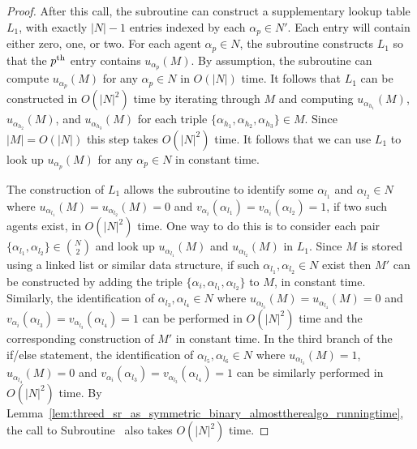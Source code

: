 \begin{proof}
After this call, the subroutine can construct a supplementary lookup table $L_1$, with exactly $|N|-1$ entries indexed by each $\alpha_p\in N'$. Each entry will contain either zero, one, or two. For each agent $\alpha_p\in N$, the subroutine constructs $L_1$ so that the $p\textsuperscript{th}$ entry contains $u_{\alpha_p}(M)$. By assumption, the subroutine can compute $u_{\alpha_p}(M)$ for any $\alpha_p\in N$ in $O(|N|)$ time. It follows that $L_1$ can be constructed in $O(|N|^2)$ time by iterating through $M$ and computing $u_{\alpha_{h_1}}(M)$, $u_{\alpha_{h_2}}(M)$, and $u_{\alpha_{h_3}}(M)$ for each triple $\{ \alpha_{h_1}, \alpha_{h_2}, \alpha_{h_3} \} \in M$. Since $|M|=O(|N|)$ this step takes $O(|N|^2)$ time. It follows that we can use $L_1$ to look up $u_{\alpha_{p}}(M)$ for any $\alpha_{p}\in N$ in constant time.

The construction of $L_1$ allows the subroutine to identify some $\alpha_{l_1}$ and $\alpha_{l_2}\in N$ where $u_{\alpha_{l_1}}(M)=u_{\alpha_{l_2}}(M)=0$ and $v_{\alpha_i}(\alpha_{l_1})=v_{\alpha_i}(\alpha_{l_2})=1$, if two such agents exist, in $O(|N|^2)$ time. One way to do this is to consider each pair $\{ \alpha_{l_1}, \alpha_{l_2} \} \in \binom{N}{2}$ and look up $u_{\alpha_{l_1}}(M)$ and $u_{\alpha_{l_2}}(M)$ in $L_1$. Since $M$ is stored using a linked list or similar data structure, if such $\alpha_{l_1}, \alpha_{l_2}\in N$ exist then $M'$ can be constructed by adding the triple $\{ \alpha_i, \alpha_{l_1}, \alpha_{l_2} \}$ to $M$, in constant time. Similarly, the identification of $\alpha_{l_3}, \alpha_{l_4}\in N$ where $u_{\alpha_{l_3}}(M)=u_{\alpha_{l_4}}(M)=0$ and $v_{\alpha_i}(\alpha_{l_3})=v_{\alpha_{l_3}}(\alpha_{l_4})=1$ can be performed in $O(|N|^2)$ time and the corresponding construction of $M'$ in constant time. In the third branch of the if/else statement, the identification of $\alpha_{l_5}, \alpha_{l_6}\in N$ where $u_{\alpha_{l_3}}(M)=1$, $u_{\alpha_{l_4}}(M)=0$ and $v_{\alpha_i}(\alpha_{l_3})=v_{\alpha_{l_3}}(\alpha_{l_4})=1$ can be similarly performed in $O(|N|^2)$ time. By Lemma~\ref{lem:threed_sr_as_symmetric_binary_almosttherealgo_runningtime}, the call to Subroutine~ also takes $O(|N|^2)$ time.
\end{proof}